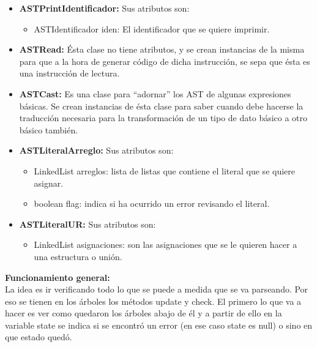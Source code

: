 \documentclass[11pt, spanish]{report}
\begin{document}
\begin{itemize}
\begin{itemize}
  \item \textbf{ASTPrintIdentificador:}
    Sus atributos son:
    \begin{itemize}
    \item ASTIdentificador iden: El identificador que se quiere imprimir.
    \end{itemize}

  \item \textbf{ASTRead:}
    \'Esta clase no tiene atributos, y se crean instancias de la misma para que a la hora de generar c\'odigo de dicha instrucci\'on, se sepa que \'esta es una
    instrucci\'on de lectura.\\

  \item \textbf{ASTCast:}
    Es una clase para ``adornar'' los AST de algunas expresiones básicas. Se crean instancias de \'esta clase para saber cuando debe hacerse la traducci\'on 
    necesaria para la transformaci\'on de un tipo de dato b\'asico a otro b\'asico tambi\'en.

  \item \textbf{ASTLiteralArreglo:}
    Sus atributos son:
    \begin{itemize}
    \item LinkedList arreglos: lista de listas que contiene el literal que se quiere asignar.
    \item boolean flag: indica si ha ocurrido un error revisando el literal.
    \end{itemize}

  \item \textbf{ASTLiteralUR:}
    Sus atributos son:
    \begin{itemize}
    \item LinkedList asignaciones: son las asignaciones que se le quieren hacer a una estructura o uni\'on.
    \end{itemize}
  \end{itemize}
\end{itemize}

\textbf{Funcionamiento general:}\\

La idea es ir verificando todo lo que se puede a medida que se va parseando. Por eso se tienen en los \'arboles los m\'etodos update y check. El primero lo que va 
a hacer es ver como quedaron los \'arboles abajo de \'el y a partir de ello en la variable state se indica si se encontr\'o un error (en ese caso state es null) o sino 
en que estado qued\'o.\\ 
\end{document}
